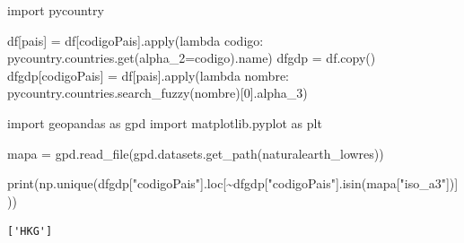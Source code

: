 \documentclass[
  letterpaper,
  DIV=11,
  numbers=noendperiod]{scrartcl}
\newenvironment{Shaded}{\begin{snugshade}}{\end{snugshade}}
\newcommand{\BuiltInTok}[1]{\textcolor[rgb]{0.00,0.23,0.31}{#1}}
\newcommand{\DecValTok}[1]{\textcolor[rgb]{0.68,0.00,0.00}{#1}}
\newcommand{\ImportTok}[1]{\textcolor[rgb]{0.00,0.46,0.62}{#1}}
\newcommand{\KeywordTok}[1]{\textcolor[rgb]{0.00,0.23,0.31}{#1}}
\newcommand{\NormalTok}[1]{\textcolor[rgb]{0.00,0.23,0.31}{#1}}
\newcommand{\OperatorTok}[1]{\textcolor[rgb]{0.37,0.37,0.37}{#1}}
\newcommand{\StringTok}[1]{\textcolor[rgb]{0.13,0.47,0.30}{#1}}
\begin{document}
\begin{Shaded}
\begin{Highlighting}[]
\ImportTok{import}\NormalTok{ pycountry}
\end{Highlighting}
\end{Shaded}

\begin{Shaded}
\begin{Highlighting}[]
\NormalTok{df[}\StringTok{\textquotesingle{}pais\textquotesingle{}}\NormalTok{] }\OperatorTok{=}\NormalTok{ df[}\StringTok{\textquotesingle{}codigoPais\textquotesingle{}}\NormalTok{].}\BuiltInTok{apply}\NormalTok{(}\KeywordTok{lambda}\NormalTok{ codigo: pycountry.countries.get(alpha\_2}\OperatorTok{=}\NormalTok{codigo).name)}
\NormalTok{dfgdp }\OperatorTok{=}\NormalTok{ df.copy()}
\NormalTok{dfgdp[}\StringTok{\textquotesingle{}codigoPais\textquotesingle{}}\NormalTok{] }\OperatorTok{=}\NormalTok{ df[}\StringTok{\textquotesingle{}pais\textquotesingle{}}\NormalTok{].}\BuiltInTok{apply}\NormalTok{(}\KeywordTok{lambda}\NormalTok{ nombre: pycountry.countries.search\_fuzzy(nombre)[}\DecValTok{0}\NormalTok{].alpha\_3)}
\end{Highlighting}
\end{Shaded}

\begin{Shaded}
\begin{Highlighting}[]
\ImportTok{import}\NormalTok{ geopandas }\ImportTok{as}\NormalTok{ gpd}
\ImportTok{import}\NormalTok{ matplotlib.pyplot }\ImportTok{as}\NormalTok{ plt}

\NormalTok{mapa }\OperatorTok{=}\NormalTok{ gpd.read\_file(gpd.datasets.get\_path(}\StringTok{\textquotesingle{}naturalearth\_lowres\textquotesingle{}}\NormalTok{))}
\end{Highlighting}
\end{Shaded}

\begin{Shaded}
\begin{Highlighting}[]
\BuiltInTok{print}\NormalTok{(np.unique(dfgdp[}\StringTok{"codigoPais"}\NormalTok{].loc[}\OperatorTok{\textasciitilde{}}\NormalTok{dfgdp[}\StringTok{"codigoPais"}\NormalTok{].isin(mapa[}\StringTok{"iso\_a3"}\NormalTok{])]))}
\end{Highlighting}
\end{Shaded}

\begin{verbatim}
['HKG']
\end{verbatim}
\end{document}
